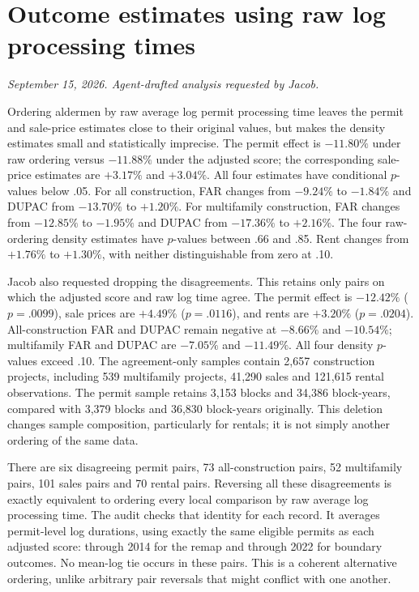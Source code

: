\clearpage
\section*{Outcome estimates using raw log processing times}
\textit{September 15, 2026. Agent-drafted analysis requested by Jacob.}

Ordering aldermen by raw average log permit processing time leaves the
permit and sale-price estimates close to their original values, but makes
the density estimates small and statistically imprecise. The permit effect
is $-11.80\%$ under raw ordering versus $-11.88\%$ under the adjusted score;
the corresponding sale-price estimates are $+3.17\%$ and $+3.04\%$. All
four estimates have conditional $p$-values below .05. For all construction,
FAR changes from $-9.24\%$ to $-1.84\%$ and DUPAC from $-13.70\%$ to
$+1.20\%$. For multifamily construction, FAR changes from $-12.85\%$ to
$-1.95\%$ and DUPAC from $-17.36\%$ to $+2.16\%$. The four raw-ordering
density estimates have $p$-values between .66 and .85. Rent changes from
$+1.76\%$ to $+1.30\%$, with neither distinguishable from zero at .10.

Jacob also requested dropping the disagreements. This retains only pairs
on which the adjusted score and raw log time agree. The permit effect is
$-12.42\%$ ($p=.0099$), sale prices are $+4.49\%$ ($p=.0116$), and rents
are $+3.20\%$ ($p=.0204$). All-construction FAR and DUPAC remain negative
at $-8.66\%$ and $-10.54\%$; multifamily FAR and DUPAC are $-7.05\%$ and
$-11.49\%$. All four density $p$-values exceed .10. The agreement-only
samples contain 2,657 construction projects, including 539 multifamily
projects, 41,290 sales and 121,615 rental observations. The permit sample
retains 3,153 blocks and 34,386 block-years, compared with 3,379 blocks and
36,830 block-years originally. This deletion changes sample composition,
particularly for rentals; it is not simply another ordering of the same data.

There are six disagreeing permit pairs, 73 all-construction pairs, 52
multifamily pairs, 101 sales pairs and 70 rental pairs. Reversing all these
disagreements is exactly equivalent to ordering every local comparison by
raw average log processing time. The audit checks that identity for each
record. It averages permit-level log durations, using exactly the same
eligible permits as each adjusted score: through 2014 for the remap and
through 2022 for boundary outcomes. No mean-log tie occurs in these pairs.
This is a coherent alternative ordering, unlike arbitrary pair reversals
that might conflict with one another.

